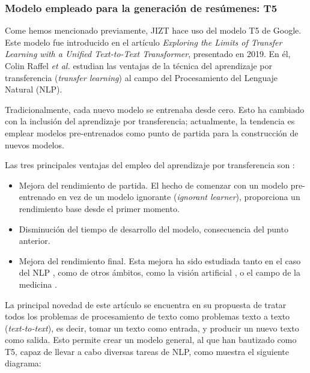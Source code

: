 \bigskip
\subsubsection{Modelo empleado para la generación de resúmenes: T5}

Come hemos mencionado previamente, JIZT hace uso del modelo T5 \cite{raffel19} de Google. Este modelo fue introducido en el artículo \emph{Exploring the Limits of Transfer Learning with a Unified Text-to-Text Transformer}, presentado en 2019. En él, Colin Raffel \emph{et al.} estudian las ventajas de la técnica del aprendizaje por transferencia (\emph{transfer learning}) al campo del Procesamiento del Lenguaje Natural (NLP).

Tradicionalmente, cada nuevo modelo se entrenaba desde cero. Esto ha cambiado con la inclusión del aprendizaje por transferencia; actualmente, la tendencia es emplear modelos pre-entrenados como punto de partida para la construcción de nuevos modelos.

Las tres principales ventajas del empleo del aprendizaje por transferencia son \cite{sarkar18}:

\vspace*{-\baselineskip}
\begin{itemize}
	\item [\textbullet] Mejora del rendimiento de partida. El hecho de comenzar con un modelo pre-entrenado en vez de un modelo ignorante (\emph{ignorant learner}), proporciona un rendimiento base desde el primer momento.
	
	\item [\textbullet] Disminución del tiempo de desarrollo del modelo, consecuencia del punto anterior.
	
	\item [\textbullet] Mejora del rendimiento final. Esta mejora ha sido estudiada tanto en el caso del NLP \cite{kumar21}, como de otros ámbitos, como la visión artificial \cite{ali21}, o el campo de la medicina \cite{liu21}.
\end{itemize}

La principal novedad de este artículo se encuentra en su propuesta de tratar todos los problemas de procesamiento de texto como problemas texto a texto (\emph{text-to-text}), es decir, tomar un texto como entrada, y producir un nuevo texto como salida. Esto permite crear un modelo general, al que han bautizado como T5, capaz de llevar a cabo diversas tareas de NLP, como muestra el siguiente diagrama:

\bigskip

